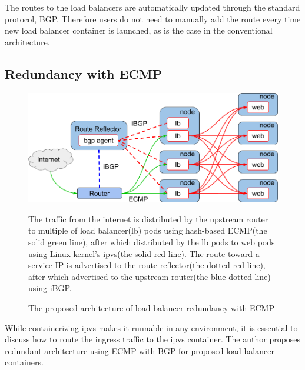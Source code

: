 The routes to the load balancers are automatically updated through the standard protocol, BGP.
Therefore users do not need to manually add the route every time new load balancer container is launched, as is the case in the conventional architecture.

\FloatBarrier

\subsection{Redundancy with ECMP}\label{Redundancy with ECMP}

\begin{figure}[tb]
  \centering
  \includegraphics[width=0.8\columnwidth]{Figs/ecmp.png}
\caption{The proposed architecture of load balancer redundancy with ECMP}

\vspace{1mm}

\begin{minipage}{0.9\columnwidth}
   The traffic from the internet is distributed by the upstream router to multiple of load balancer(lb) pods using hash-based ECMP(the solid green line), after which distributed by the lb pods to web pods using Linux kernel's ipvs(the solid red line).
  The route toward a service IP is advertised to the route reflector(the dotted red line), after which advertised to the upstream router(the blue dotted line) using iBGP.
\end{minipage}

\label{fig:ecmp}
\end{figure}

While containerizing ipvs makes it runnable in any environment, it is essential to discuss how to route the ingress traffic to the ipvs container.
The author proposes redundant architecture using ECMP with BGP for proposed load balancer containers.

